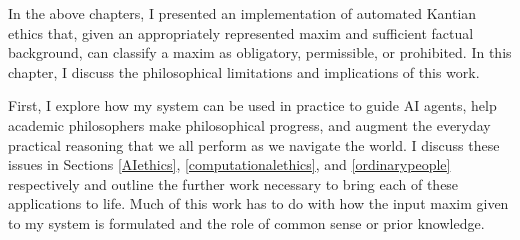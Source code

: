 %
\begin{isabellebody}%
%
%
\isadelimtheory
%
\endisadelimtheory
%
\isatagtheory
%
\endisatagtheory
{\isafoldtheory}%
%
\isadelimtheory
%
\endisadelimtheory
%
\isadelimdocument
%
\endisadelimdocument
%
\isatagdocument
%
\isamarkuptrue%
%
\endisatagdocument
{\isafolddocument}%
%
\isadelimdocument
%
\endisadelimdocument
%
\begin{isamarkuptext}%
In the above chapters, I presented an implementation of automated Kantian ethics that, given an appropriately
represented maxim and sufficient factual background, can classify a maxim as obligatory, permissible, 
or prohibited. In this chapter, I discuss the philosophical limitations and implications of this 
work.

First, I explore how my system can be used in practice to guide AI agents,
help academic philosophers make philosophical progress, and augment the everyday practical reasoning 
that we all perform as we navigate the world. I discuss these issues in Sections \ref{AIethics}, 
\ref{computationalethics}, and \ref{ordinarypeople} respectively and outline the further work
necessary to bring each of these applications to life. Much of this work has to do with how the input
maxim given to my system is formulated and the role of common sense or prior knowledge. 


\end{isamarkuptext}
\end{isabellebody}
